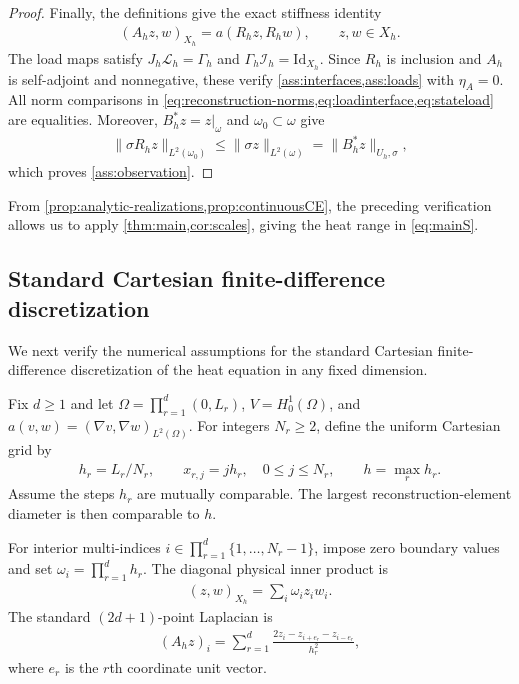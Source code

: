 \documentclass[print,wide,eng]{draft}
\begin{document}
\begin{proof}
Finally, the definitions give the exact stiffness identity
%
\begin{align*}
(A_hz,w)_{X_h}=a(R_hz,R_hw),\qquad z,w\in X_h.
\end{align*}
%
The load maps satisfy $J_h\mathcal L_h=\Gamma_h$ and $\Gamma_h\mathcal I_h=\mathrm{Id}_{X_h}$.
Since $R_h$ is inclusion and $A_h$ is self-adjoint and nonnegative, these verify \cref{ass:interfaces,ass:loads} with $\eta_A=0$. All norm comparisons in \cref{eq:reconstruction-norms,eq:loadinterface,eq:stateload} are equalities. Moreover, $B_h^*z=z|_\omega$ and $\omega_0\subset\omega$ give
%
\begin{align*}
\|\sigma R_hz\|_{L^2(\omega_0)}
\leq\|\sigma z\|_{L^2(\omega)}
=\|B_h^*z\|_{U_h,\sigma},
\end{align*}
%
which proves \cref{ass:observation}.
\end{proof}
%

From \cref{prop:analytic-realizations,prop:continuousCE}, the preceding verification allows us to apply \cref{thm:main,cor:scales}, giving the heat range in \cref{eq:mainS}.

\subsection{Standard Cartesian finite-difference discretization}\label{sec:fd}

We next verify the numerical assumptions for the standard Cartesian finite-difference discretization of the heat equation in any fixed dimension.

Fix $d\geq1$ and let $\Omega=\prod\limits_{r=1}^d(0,L_r)$, $V=H_0^1(\Omega)$, and $a(v,w)=(\nabla v,\nabla w)_{L^2(\Omega)}$. For integers $N_r\geq2$, define the uniform Cartesian grid by
%
\begin{align*}
h_r=L_r/N_r,\qquad x_{r,j}=jh_r,\quad 0\leq j\leq N_r,\qquad h=\max_r h_r.
\end{align*}
%
Assume the steps $h_r$ are mutually comparable. The largest reconstruction-element diameter is then comparable to $h$.

For interior multi-indices $i\in\prod\limits_{r=1}^d\{1,\ldots,N_r-1\}$, impose zero boundary values and set $\omega_i=\prod\limits_{r=1}^d h_r$. The diagonal physical inner product is\vspace{-4mm}
%
\begin{align*}
(z,w)_{X_h}=\sum_i\omega_i z_iw_i.
\end{align*}
%
The standard $(2d+1)$-point Laplacian is\vspace{-2mm}
%
\begin{align}\label{eq:physicalFD}
(A_hz)_i=\sum_{r=1}^d\frac{2z_i-z_{i+e_r}-z_{i-e_r}}{h_r^2},
\end{align}
%
where $e_r$ is the $r$th coordinate unit vector.
\end{document}
